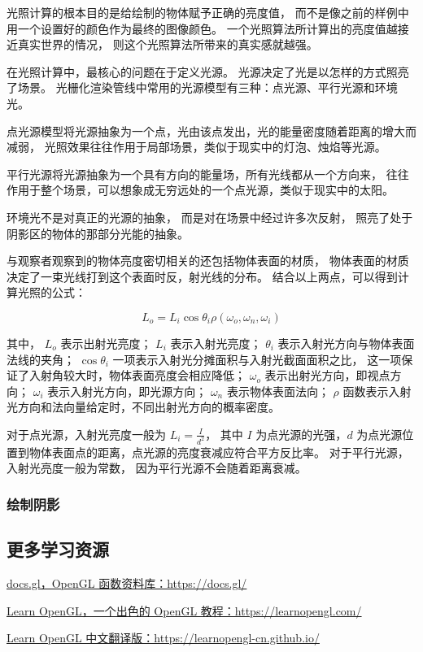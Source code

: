 \documentclass[fontset=windows]{ctexart}
\begin{document}
光照计算的根本目的是给绘制的物体赋予正确的亮度值，
而不是像之前的样例中用一个设置好的颜色作为最终的图像颜色。
一个光照算法所计算出的亮度值越接近真实世界的情况，
则这个光照算法所带来的真实感就越强。

在光照计算中，最核心的问题在于定义光源。
光源决定了光是以怎样的方式照亮了场景。
光栅化渲染管线中常用的光源模型有三种：点光源、平行光源和环境光。

点光源模型将光源抽象为一个点，光由该点发出，光的能量密度随着距离的增大而减弱，
光照效果往往作用于局部场景，类似于现实中的灯泡、烛焰等光源。

平行光源将光源抽象为一个具有方向的能量场，所有光线都从一个方向来，
往往作用于整个场景，可以想象成无穷远处的一个点光源，类似于现实中的太阳。

环境光不是对真正的光源的抽象，
而是对在场景中经过许多次反射，
照亮了处于阴影区的物体的那部分光能的抽象。

与观察者观察到的物体亮度密切相关的还包括物体表面的材质，
物体表面的材质决定了一束光线打到这个表面时反，射光线的分布。
结合以上两点，可以得到计算光照的公式：

$$L_o=L_i\cos\theta_i\rho\left(\omega_o, \omega_n, \omega_i\right)$$

其中，
$L_o$ 表示出射光亮度；
$L_i$ 表示入射光亮度；
$\theta_i$ 表示入射光方向与物体表面法线的夹角；
$\cos\theta_i$ 一项表示入射光分摊面积与入射光截面面积之比，
这一项保证了入射角较大时，物体表面亮度会相应降低；
$\omega_o$ 表示出射光方向，即视点方向；
$\omega_i$ 表示入射光方向，即光源方向；
$\omega_n$ 表示物体表面法向；
$\rho$ 函数表示入射光方向和法向量给定时，不同出射光方向的概率密度。

对于点光源，入射光亮度一般为 $L_i=\frac{I}{d^2}$，
其中 $I$ 为点光源的光强，$d$ 为点光源位置到物体表面点的距离，点光源的亮度衰减应符合平方反比率。
对于平行光源，入射光亮度一般为常数，
因为平行光源不会随着距离衰减。


\subsubsection{绘制阴影}

\subsection{更多学习资源}

\label{sec-gl:study-resources}

\href{https://docs.gl}{docs.gl，OpenGL 函数资料库：https://docs.gl/}

\href{https://learnopengl.com/}{Learn OpenGL，一个出色的 OpenGL 教程：https://learnopengl.com/}

\href{https://learnopengl-cn.github.io/}{Learn OpenGL 中文翻译版：https://learnopengl-cn.github.io/}
\end{document}

